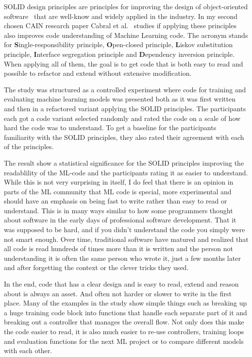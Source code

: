 \documentclass[a4paper,twocolumn]{article}
\begin{document}
SOLID design principles are principles for improving the design of
object-oriented software~\cite{Martin2009} that are well-know and widely applied
in the industry. In my second chosen CAIN research paper Cabral et
al.~\cite{Cabral2024} studies if applying these principles also improves code
understanding of Machine Learning code. The acronym stands for
\textbf{S}ingle-responsibility principle, \textbf{O}pen-closed principle,
\textbf{L}iskov substitution principle, \textbf{I}nterface segregation principle
and \textbf{D}ependency inversion principle. When applying all of them, the goal
is to get code that is both easy to read and possible to refactor and extend
without extensive modification.

The study was structured as a controlled experiment where code for training and
evaluating machine learning models was presented both as it was first written
and then in a refactored variant applying the SOLID principles. The participants
each got a code variant selected randomly and rated the code on a scale of how
hard the code was to understand. To get a baseline for the participants
familiarity with the SOLID principles, they also rated their agreement with each
of the principles. 

The result show a statistical significance for the SOLID principles improving
the readablility of the ML-code and the participants rating it as easier to
understand. While this is not very surprising in itself, I do feel that there is
an opinion in parts of the ML community that ML code is special, more
experimental and should have an emphasis on being fast to write rather than easy
to read or understand. This is in many ways similar to how some programmers
thought about software in the early days of professional software development.
That it was supposed to be hard, and if you didn't understand the code you
simply were not smart enough. Over time, traditional software have matured and
realized that all code is read hundreds of times more than it is written and the
person not understanding it is often the same person who wrote it, just a few
months later and after forgetting the context or the clever tricks they used. 

In the end, code that has a clear design and is easy to read, extend and reason
about is always an asset. And often not harder or slower to write in the first
place. Many of the examples in the study show simple things such as breaking up
a huge training code block into functions that handle each separate part of it
and breaking out a controller that manages the overall flow. Not only does this
make the code easier to read, it is also much easier to re-use controllers,
training loops and evaluation functions for the next ML project or to compare
different models with each other. 
\end{document}
